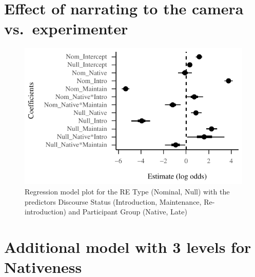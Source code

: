 \documentclass[]{elsarticle} %
\begin{document}
\clearpage

\onecolumn

\hypertarget{effect-of-narrating-to-the-camera-vs.-experimenter}{%
\section{Effect of narrating to the camera
vs.~experimenter}\label{effect-of-narrating-to-the-camera-vs.-experimenter}}

\label{section:c}

\begin{figure}
\centering
\includegraphics{manuscript_v2_files/figure-latex/fig:model-camera-1.pdf}
\caption{Regression model plot for the RE Type (Nominal, Null) with the
predictors Discourse Status (Introduction, Maintenance, Re-introduction)
and Participant Group (Native, Late)}
\end{figure}

\clearpage

\hypertarget{additional-model-with-3-levels-for-nativeness}{%
\section{Additional model with 3 levels for
Nativeness}\label{additional-model-with-3-levels-for-nativeness}}

\label{section:d}
\end{document}
